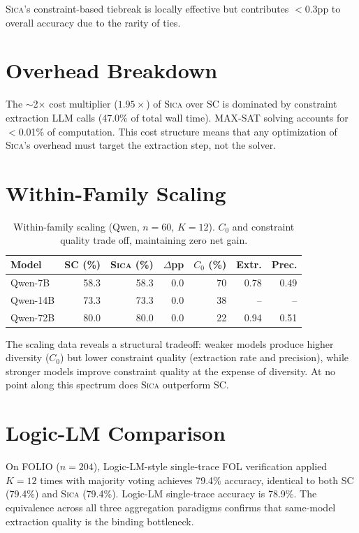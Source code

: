 \documentclass[11pt,a4paper]{article}
\newcommand{\sica}{\textsc{Sica}}
\begin{document}
\sica{}'s constraint-based tiebreak is locally effective but contributes $<0.3$pp to overall accuracy due to the rarity of ties.

\section{Overhead Breakdown}
\label{app:overhead}

The $\sim$2$\times$ cost multiplier ($1.95\times$) of \sica{} over SC is dominated by constraint extraction LLM calls (47.0\% of total wall time).
MAX-SAT solving accounts for $<$0.01\% of computation.
This cost structure means that any optimization of \sica{}'s overhead must target the extraction step, not the solver.

\section{Within-Family Scaling}
\label{app:scaling}

\begin{table}[h]
\centering
\caption{Within-family scaling (Qwen, $n=60$, $K=12$). $C_0$ and constraint quality trade off, maintaining zero net gain.}
\label{tab:scaling}
\small
\begin{tabular}{lrrrrrr}
\toprule
\textbf{Model} & \textbf{SC (\%)} & \textbf{\sica{} (\%)} & \textbf{$\Delta$pp} & \textbf{$C_0$ (\%)} & \textbf{Extr.} & \textbf{Prec.} \\
\midrule
Qwen-7B & 58.3 & 58.3 & 0.0 & 70 & 0.78 & 0.49 \\
Qwen-14B & 73.3 & 73.3 & 0.0 & 38 & -- & -- \\
Qwen-72B & 80.0 & 80.0 & 0.0 & 22 & 0.94 & 0.51 \\
\bottomrule
\end{tabular}
\end{table}

The scaling data reveals a structural tradeoff: weaker models produce higher diversity ($C_0$) but lower constraint quality (extraction rate and precision), while stronger models improve constraint quality at the expense of diversity.
At no point along this spectrum does \sica{} outperform SC.

\section{Logic-LM Comparison}
\label{app:logiclm}

On FOLIO ($n=204$), Logic-LM-style single-trace FOL verification applied $K=12$ times with majority voting achieves 79.4\% accuracy, identical to both SC (79.4\%) and \sica{} (79.4\%).
Logic-LM single-trace accuracy is 78.9\%.
The equivalence across all three aggregation paradigms confirms that same-model extraction quality is the binding bottleneck.
\end{document}
